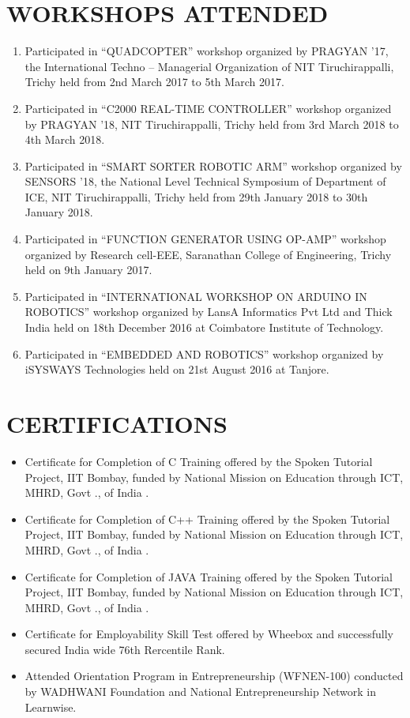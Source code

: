 \documentclass[margin,line]{res}
\begin{document}
\begin{resume}
\section{\sc WORKSHOPS ATTENDED}
\begin{enumerate}
\item Participated in “QUADCOPTER” workshop organized by PRAGYAN ’17, the International Techno – Managerial Organization of NIT Tiruchirappalli, Trichy held from 2nd March 2017 to 5th March 2017.
\item Participated in “C2000 REAL-TIME CONTROLLER” workshop organized by PRAGYAN ’18, NIT Tiruchirappalli, Trichy held from 3rd March 2018 to 4th March 2018.
\item Participated in “SMART SORTER ROBOTIC ARM” workshop organized by SENSORS ’18, the National Level Technical Symposium of Department of ICE, NIT Tiruchirappalli, Trichy held from 29th January 2018 to 30th January 2018.
\item Participated in “FUNCTION GENERATOR USING OP-AMP” workshop organized by Research cell-EEE, Saranathan College of Engineering, Trichy held on 9th January 2017.
\item Participated in “INTERNATIONAL WORKSHOP ON ARDUINO IN ROBOTICS” workshop organized by LansA Informatics Pvt Ltd and Thick India held on 18th December 2016 at Coimbatore Institute of Technology.
\item Participated in “EMBEDDED AND ROBOTICS” workshop organized by iSYSWAYS Technologies held on 21st August 2016 at Tanjore.
\end{enumerate}

\section{\sc CERTIFICATIONS}
\begin{itemize}
\item Certificate for Completion of C Training offered by the Spoken Tutorial Project, IIT Bombay, funded by National Mission on Education through ICT, MHRD, Govt ., of India .
\item Certificate for Completion of C++ Training offered by the Spoken Tutorial Project, IIT Bombay, funded by National Mission on Education through ICT, MHRD, Govt ., of India .
\item Certificate for Completion of JAVA Training offered by the Spoken Tutorial Project, IIT Bombay, funded by National Mission on Education through ICT, MHRD, Govt ., of India .
\item Certificate for Employability Skill Test offered by Wheebox and successfully secured India wide 76th Rercentile Rank.
\item Attended Orientation Program in Entrepreneurship (WFNEN-100) conducted by WADHWANI Foundation and National Entrepreneurship Network in Learnwise. 
\end{itemize}


\end{resume}
\end{document}
